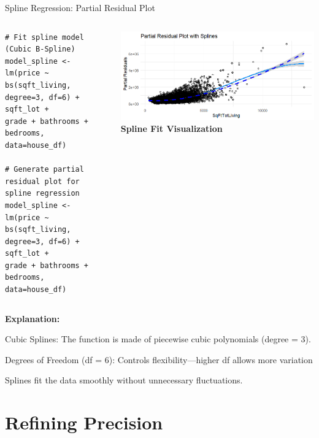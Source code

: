 \documentclass{beamer}
\begin{document}
	\begin{frame}{Spline Regression: Partial Residual Plot}
	\begin{columns}
		\begin{tcolorbox}
			\begin{lstlisting}
# Fit spline model (Cubic B-Spline)
model_spline <- lm(price ~ bs(sqft_living, degree=3, df=6) + sqft_lot +
grade + bathrooms + bedrooms, data=house_df)

# Generate partial residual plot for spline regression
model_spline <- lm(price ~ bs(sqft_living, degree=3, df=6) + sqft_lot +
grade + bathrooms + bedrooms, data=house_df)
\end{lstlisting}
		\end{tcolorbox}
		
		\centering
		\includegraphics[width=\linewidth]{spline.png}
		\textbf{Spline Fit Visualization}
	\end{columns}
	
	\vspace{1em}
	\textbf{Explanation:} 
	\item	Cubic Splines: The function is made of piecewise cubic polynomials (degree = 3).
		\item Degrees of Freedom (df = 6): Controls flexibility—higher df allows more variation
			\item Splines fit the data smoothly without unnecessary fluctuations.
	\end{frame}
	
	
	

	
	\section{Refining Precision}
	
	
\end{document}
